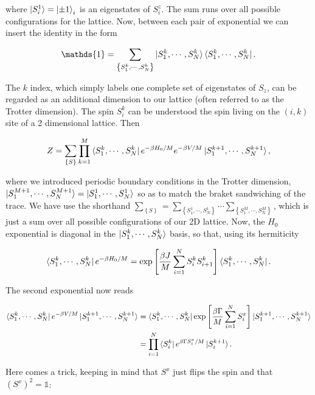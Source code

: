 \documentclass[11pt,openany]{article}
\begin{document}
where $\ket{S_i^1} = \ket{\pm1}_i$ is an eigenstates of $S_i^z$. The sum runs over all possible configurations for the lattice. Now, between each pair of exponential we can insert the identity in the form

\begin{equation}
	\mathds{1} = \sum_{\left\{S^k_1,\cdots,S^k_N\right\}}\ket{S^k_1,\cdots,S^k_N}\bra{S^k_1,\cdots,S^k_N}.
\end{equation}

The $k$ index, which simply labels one complete set of eigenstates of $S_z$, can be regarded as an additional dimension to our lattice (often referred to as the Trotter dimension). The spin $S_i^k$ can be understood the spin living on the $(i,k)$ site of a 2 dimensional lattice. Then

\begin{equation}
	Z = \sum_{\left\{S\right\}}\prod_{k=1}^M\bra{S^k_1,\cdots,S^k_N}e^{-\beta H_0/M}e^{-\beta V/M}\ket{S^{k+1}_1,\cdots,S^{k+1}_N},
\end{equation}

where we introduced periodic boundary conditions in the Trotter dimension, $\ket{S^{M+1}_1,\cdots,S^{M+1}_N} = \ket{S^1_1,\cdots,S^1_N}$ so as to match the braket sandwiching of the trace. We have use the shorthand $\sum_{\left\{S\right\}} = \sum_{\left\{S_1^1,\cdots,S_N^1\right\}}\cdots\sum_{\left\{S_1^M,\cdots,S_N^M\right\}}$, which is just a sum over all possible configurations of our 2D lattice. Now, the $H_0$ exponential is diagonal in the $\ket{S^k_1,\cdots,S^k_N}$ basis, so that, using its hermiticity

\begin{equation}
	\bra{S^k_1,\cdots,S^k_N}e^{-\beta H_0/M} = \exp\left[\frac{\beta J}{M}\sum_{i=1}^N S_i^k S_{i+1}^k\right]\bra{S^k_1,\cdots,S^k_N}.
\end{equation}

The second exponential now reads

\begin{align*}
	\bra{S^k_1,\cdots,S^k_N}e^{-\beta V/M}\ket{S^{k+1}_1,\cdots,S^{k+1}_N} &= \bra{S^k_1,\cdots,S^k_N}\exp\left[\frac{\beta\Gamma}{M}\sum_{i=1}^N S_i^x\right]\ket{S^{k+1}_1,\cdots,S^{k+1}_N}\\
	&= \prod_{i=1}^N\bra{S_i^k}e^{\beta\Gamma S_i^x/M}\ket{S_i^{k+1}}.
\end{align*}

Here comes a trick, keeping in mind that $S^x$ just flips the spin and that $(S^x)^2=\mathds{1}$:
\end{document}
